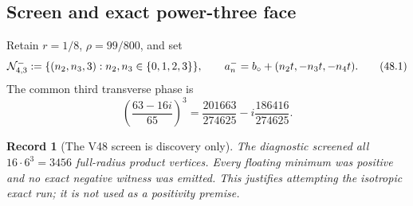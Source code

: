 \documentclass[11pt,oneside]{article}
\newtheorem{record}[theorem]{Record}
\theoremstyle{definition}
\theoremstyle{remark}
\begin{document}
\subsection{Screen and exact power-three face}

Retain \(r=1/8\), \(\rho=99/800\), and set
\[
 {\cal N}_{4,3}^{-}:=
 \{(n_2,n_3,3):n_2,n_3\in\{0,1,2,3\}\},\qquad
 a_n^-=b_\circ+(n_2t,-n_3t,-n_4t).                   \tag{48.1}
\]
The common third transverse phase is
\[
 \left(\frac{63-16i}{65}\right)^3
 =\frac{201663}{274625}
  -i\frac{186416}{274625}.                            \tag{48.2}
\]

\begin{record}[The V48 screen is discovery only]
\label{rec:newv48-screen}
The diagnostic screened all
\(16\cdot6^3=3456\) full-radius product vertices.  Every floating
minimum was positive and no exact negative witness was emitted.
This justifies attempting the isotropic exact run; it is not used
as a positivity premise.
\end{record}
\end{document}
